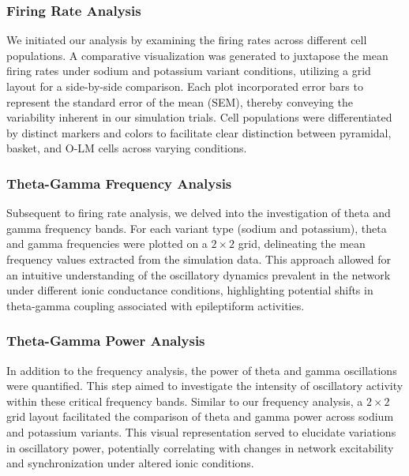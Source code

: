 \subsubsection{Firing Rate Analysis}
We initiated our analysis by examining the firing rates across different cell
populations. A comparative visualization was generated to juxtapose the mean
firing rates under sodium and potassium variant conditions, utilizing a grid
layout for a side-by-side comparison. Each plot incorporated error bars to
represent the standard error of the mean (SEM), thereby conveying the
variability inherent in our simulation trials. Cell populations were
differentiated by distinct markers and colors to facilitate clear distinction
between pyramidal, basket, and O-LM cells across varying conditions.

\subsubsection{Theta-Gamma Frequency Analysis}
Subsequent to firing rate analysis, we delved into the investigation of theta
and gamma frequency bands. For each variant type (sodium and potassium), theta
and gamma frequencies were plotted on a \(2\times2\) grid, delineating the mean
frequency values extracted from the simulation data. This approach allowed for
an intuitive understanding of the oscillatory dynamics prevalent in the network
under different ionic conductance conditions, highlighting potential shifts in
theta-gamma coupling associated with epileptiform activities.

\subsubsection{Theta-Gamma Power Analysis}
In addition to the frequency analysis, the power of theta and gamma oscillations were quantified.
This step aimed to investigate the intensity of oscillatory activity within these critical frequency bands.
Similar to our frequency analysis, a \(2\times2\) grid layout facilitated the comparison of theta and gamma power
across sodium and potassium variants. This visual representation served to
elucidate variations in oscillatory power, potentially correlating with changes
in network excitability and synchronization under altered ionic conditions.


